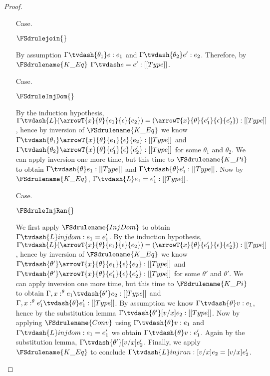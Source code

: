 \begin{proof}
\begin{itemize}
  \item[Case.] \ \\
    \begin{center}
      $\FSdrulejoin{}$
    \end{center}
    By assumption $\Gamma \tvdash{\theta_1} e:e_1$ and $\Gamma \tvdash{\theta_2} e':e_2$.  
    Therefore, by $\FSdrulename{K\_Eq}$ $\Gamma \tvdash e = e':[[Type]]$.

  \item[Case.] \ \\
    \begin{center}
      $\FSdruleInjDom{}$
    \end{center}
    By the induction hypothesis, 
    $\Gamma \tvdash{L} (\arrowT{x}{\theta}{e_1}{\epsilon}{e_2}) = 
    (\arrowT{x}{\theta}{e'_1}{\epsilon}{e'_2}):[[Type]]$, hence by inversion of 
    $\FSdrulename{K\_Eq}$ we know
    $\Gamma \tvdash{\theta_1} \arrowT{x}{\theta}{e_1}{\epsilon}{e_2}:[[Type]]$ and
    $\Gamma \tvdash{\theta_2} \arrowT{x}{\theta}{e'_1}{\epsilon}{e'_2}:[[Type]]$ for some $\theta_1$
    and $\theta_2$.  We can apply inversion one more time, but this time to 
    $\FSdrulename{K\_Pi}$ to obtain $\Gamma \tvdash{\theta} e_1:[[Type]]$ and 
    $\Gamma \tvdash{\theta} e'_1:[[Type]]$.  Now by 
    $\FSdrulename{K\_Eq}$, $\Gamma \tvdash{L} e_1 = e'_1:[[Type]]$.

  \item[Case.] \ \\
    \begin{center}
      $\FSdruleInjRan{}$
    \end{center}
    We first apply $\FSdrulename{InjDom}$ to obtain $\Gamma \tvdash{L} injdom:e_1 = e'_1$.
    By the induction hypothesis, 
    $\Gamma \tvdash{L} (\arrowT{x}{\theta}{e_1}{\epsilon}{e_2}) = 
    (\arrowT{x}{\theta}{e'_1}{\epsilon}{e'_2}):[[Type]]$, hence by inversion of 
    $\FSdrulename{K\_Eq}$ we know
    $\Gamma \tvdash{\theta'} \arrowT{x}{\theta}{e_1}{\epsilon}{e_2}:[[Type]]$ and
    $\Gamma \tvdash{\theta'} \arrowT{x}{\theta}{e'_1}{\epsilon}{e'_2}:[[Type]]$ for some $\theta'$
    and $\theta'$.  We can apply inversion one more time, but this time to 
    $\FSdrulename{K\_Pi}$ to obtain $\Gamma,x:^\theta e_1 \tvdash{\theta'} e_2:[[Type]]$ and 
    $\Gamma,x:^\theta e'_1 \tvdash{\theta} e'_1:[[Type]]$.  By assumption we know
    $\Gamma \tvdash{\theta} v:e_1$, hence by the substitution lemma 
    $\Gamma \tvdash{\theta'}[v/x]e_2:[[Type]]$.  Now by applying $\FSdrulename{Conv}$ using
    $\Gamma \tvdash{\theta} v:e_1$ and $\Gamma \tvdash{L} injdom:e_1 = e'_1$ we obtain
    $\Gamma \tvdash{\theta} v:e'_1$.  Again by the substitution lemma, 
    $\Gamma \tvdash{\theta'} [v/x]e'_2$.  Finally, we apply $\FSdrulename{K\_Eq}$ to conclude
    $\Gamma \tvdash{L} injran:[v/x]e_2 = [v/x]e'_2$.


\end{itemize}
\end{proof}
